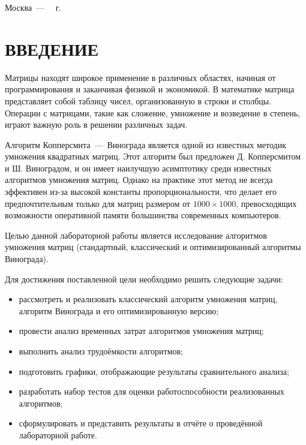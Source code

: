 \documentclass[a4paper, 12pt]{extreport}
\begin{document}
\begin{titlepage}
	\begin{center}
		\vfill
		Москва~---~\the\year
		~г.
	\end{center}
	\restoregeometry
\end{titlepage}

\setcounter{page}{2}

\def\contentsname{\begin{center}\MakeUppercase{СОДЕРЖАНИЕ}\end{center}}
\tableofcontents



\chapter*{ВВЕДЕНИЕ}

Матрицы находят широкое применение в различных областях, начиная от программирования и заканчивая физикой и экономикой. В математике матрица представляет собой таблицу чисел, организованную в строки и столбцы. Операции с матрицами, такие как сложение, умножение и возведение в степень, играют важную роль в решении различных задач.

Алгоритм Копперсмита~---~Винограда является одной из известных методик умножения квадратных матриц. Этот алгоритм был предложен Д. Копперсмитом и Ш. Виноградом, и он имеет наилучшую асимптотику среди известных алгоритмов умножения матриц. Однако на практике этот метод не всегда эффективен из-за высокой константы пропорциональности, что делает его предпочтительным только для матриц размером от $1000 \times 1000$, превосходящих возможности оперативной памяти большинства современных компьютеров.

Целью данной лабораторной работы является исследование алгоритмов умножения матриц (стандартный, классический и оптимизированный алгоритмы Винограда).

Для достижения поставленной цели необходимо решить следующие задачи:
\begin{itemize}
    \item[--] рассмотреть и реализовать классический алгоритм умножения матриц, алгоритм Винограда и его оптимизированную версию;
    \item[--] провести анализ временных затрат алгоритмов умножения матриц;
    \item[--] выполнить анализ трудоёмкости алгоритмов;
    \item[--] подготовить графики, отображающие результаты сравнительного анализа;
    \item[--] разработать набор тестов для оценки работоспособности реализованных алгоритмов;
    \item[--] сформулировать и представить результаты в отчёте о проведённой лабораторной работе.
\end{itemize}
\end{document}
